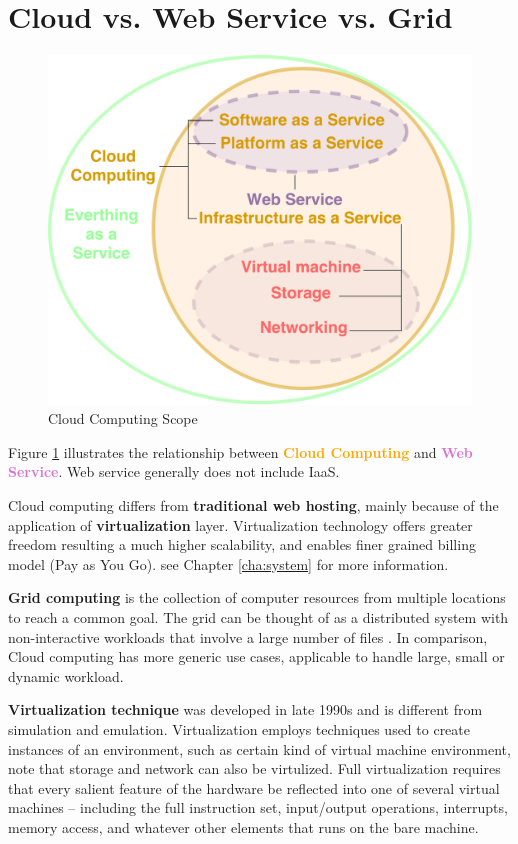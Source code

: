 \section{Cloud vs. Web Service vs. Grid}

\begin{figure}[ht]
  \includegraphics[width=\textwidth]{Figures/background/cloud_computing_venn.pdf}
  \caption{Cloud Computing Scope}
  \label{fig:cloud_computing}
\end{figure}
Figure \ref{fig:cloud_computing} illustrates the relationship between 
\textcolor{orange}{\textbf{Cloud Computing}}
and \textcolor{Orchid}{\textbf{Web Service}}. Web service generally does not include IaaS.

Cloud computing differs from \textbf{traditional web hosting},
mainly because of the application of \textbf{virtualization} layer.
Virtualization technology offers greater freedom resulting a
much higher scalability, and enables finer grained billing model (Pay as You Go).
see Chapter \ref{cha:system} for more information.

\textbf{Grid computing} is the collection of computer resources from multiple locations to reach a common goal. The grid can be thought of as a distributed system with non-interactive workloads that involve a large number of files \cite{grid_computing}.
In comparison, Cloud computing has more generic use cases, applicable to handle large, small or dynamic workload.

\textbf{Virtualization technique} \cite{virtualization} was developed in late 1990s and is different from simulation and emulation.
Virtualization employs techniques used to create instances of an environment, such as certain kind of virtual machine environment, note that storage and network can also be virtulized.
Full virtualization requires that every salient feature of the hardware be reflected into one of several virtual machines – including the full instruction set, input/output operations, interrupts, memory access, and whatever other elements that runs on the bare machine.

